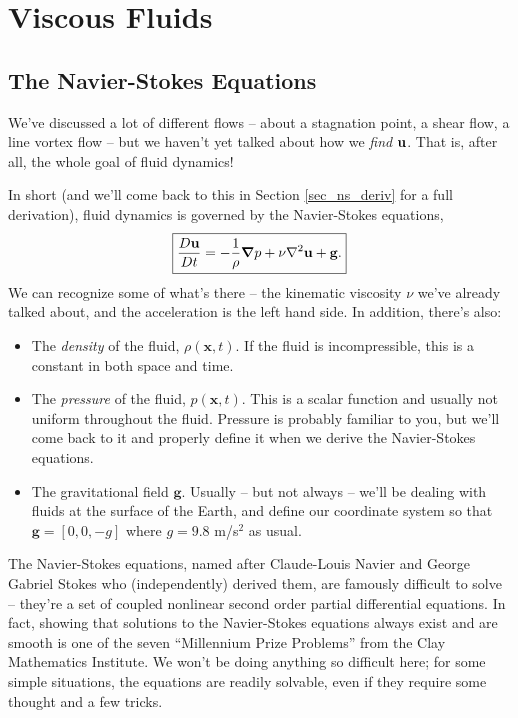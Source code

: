 \chapter{Viscous Fluids}

%
% 

\section{The Navier-Stokes Equations}

We've discussed a lot of different flows -- about a stagnation point, a shear flow, a line vortex flow -- but we haven't yet talked about how we \emph{find} $\mathbf{u}$.  That is, after all, the whole goal of fluid dynamics!

In short (and we'll come back to this in Section \ref{sec_ns_deriv} for a full derivation), fluid dynamics is governed by the Navier-Stokes equations,
\begin{equation}
\boxed{
\frac{D \mathbf{u}}{Dt} = -\frac{1}{\rho} \boldsymbol{\nabla} p + \nu \nabla^2 \mathbf{u} +  \mathbf{g}.
}
\end{equation}
We can recognize some of what's there -- the kinematic viscosity $\nu$ we've already talked about, and the acceleration is the left hand side.  In addition, there's also:
\begin{itemize}
\item The \emph{density} of the fluid, $\rho(\mathbf{x}, t)$.  If the fluid is incompressible, this is a constant in both space and time.
\item The \emph{pressure} of the fluid, $p(\mathbf{x}, t)$.  This is a scalar function and usually not uniform throughout the fluid.  Pressure is probably familiar to you, but we'll come back to it and properly define it when we derive the Navier-Stokes equations.
\item The gravitational field $\mathbf{g}$.  Usually -- but not always -- we'll be dealing with fluids at the surface of the Earth, and define our coordinate system so that $\mathbf{g} = [0,0,-g]$ where $g = 9.8$ m/s$^2$ as usual. 
\end{itemize}

The Navier-Stokes equations, named after Claude-Louis Navier and George Gabriel Stokes who (independently) derived them, are famously difficult to solve -- they're a set of coupled nonlinear second order partial differential equations.  In fact, showing that solutions to the Navier-Stokes equations always exist and are smooth is one of the seven ``Millennium Prize Problems'' from the Clay Mathematics Institute.  We won't be doing anything so difficult here; for some simple situations, the equations are readily solvable, even if they require some thought and a few tricks.


